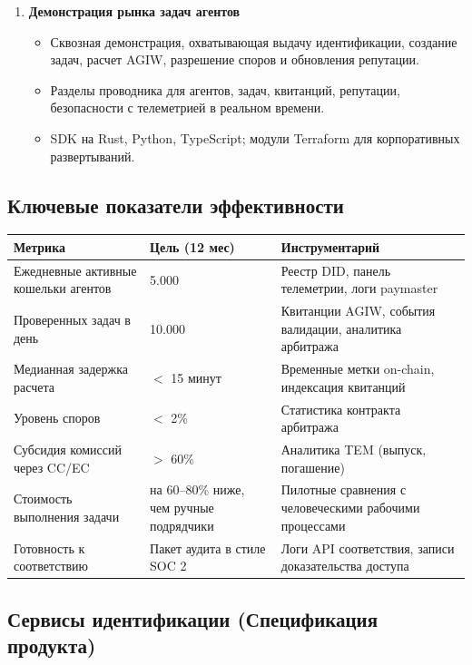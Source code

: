 \documentclass[11pt]{article}
\begin{document}
\begin{enumerate}[label=\textbf{D\arabic*.}, leftmargin=*]
  \item \textbf{Демонстрация рынка задач агентов}
  \begin{itemize}[noitemsep]
    \item Сквозная демонстрация, охватывающая выдачу идентификации, создание задач, расчет AGIW, разрешение споров и обновления репутации.
    \item Разделы проводника для агентов, задач, квитанций, репутации, безопасности с телеметрией в реальном времени.
    \item SDK на Rust, Python, TypeScript; модули Terraform для корпоративных развертываний.
  \end{itemize}
\end{enumerate}

\subsection{Ключевые показатели эффективности}
\begin{longtable}{@{}p{}p{}p{}@{}}
\toprule
\textbf{Метрика} & \textbf{Цель (12 мес)} & \textbf{Инструментарий} \\\midrule
Ежедневные активные кошельки агентов & 5.000 & Реестр DID, панель телеметрии, логи paymaster \\
Проверенных задач в день & 10.000 & Квитанции AGIW, события валидации, аналитика арбитража \\
Медианная задержка расчета & $<$ 15 минут & Временные метки on-chain, индексация квитанций \\
Уровень споров & $<$ 2\% & Статистика контракта арбитража \\
Субсидия комиссий через CC/EC & $>$ 60\% & Аналитика TEM (выпуск, погашение) \\
Стоимость выполнения задачи & на 60--80\% ниже, чем ручные подрядчики & Пилотные сравнения с человеческими рабочими процессами \\
Готовность к соответствию & Пакет аудита в стиле SOC 2 & Логи API соответствия, записи доказательства доступа \\
\bottomrule
\end{longtable}

\subsection{Сервисы идентификации (Спецификация продукта)}
\label{sec:identity-spec}
\end{document}
